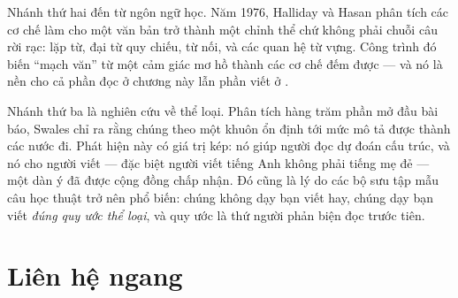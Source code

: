 \documentclass[../../english.tex]{subfiles}
\begin{document}
Nhánh thứ hai đến từ ngôn ngữ học. Năm 1976, Halliday và Hasan phân tích các cơ chế làm cho một văn bản trở thành một chỉnh thể chứ không phải chuỗi câu rời rạc\cite{halliday1976}: lặp từ, đại từ quy chiếu, từ nối, và các quan hệ từ vựng. Công trình đó biến ``mạch văn'' từ một cảm giác mơ hồ thành các cơ chế đếm được --- và nó là nền cho cả phần đọc ở chương này lẫn phần viết ở .

Nhánh thứ ba là nghiên cứu về thể loại. Phân tích hàng trăm phần mở đầu bài báo, Swales chỉ ra rằng chúng theo một khuôn ổn định tới mức mô tả được thành các nước đi\cite{swales1990}. Phát hiện này có giá trị kép: nó giúp người đọc dự đoán cấu trúc, và nó cho người viết --- đặc biệt người viết tiếng Anh không phải tiếng mẹ đẻ --- một dàn ý đã được cộng đồng chấp nhận. Đó cũng là lý do các bộ sưu tập mẫu câu học thuật\cite{manchesterphrasebank,swalesfeak2012} trở nên phổ biến: chúng không dạy bạn viết hay, chúng dạy bạn viết \emph{đúng quy ước thể loại}, và quy ước là thứ người phản biện đọc trước tiên.

\begin{gocre}
\end{gocre}

\section{Liên hệ ngang}
\end{document}
